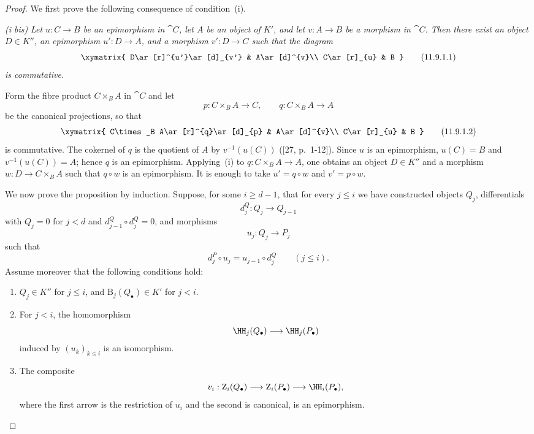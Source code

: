 \begin{proof}
We first prove the following consequence of condition~(i).

\medskip\noindent
\emph{(i bis)}
\emph{Let $u:C\to B$ be an epimorphism in $\cat{C}$, let $A$ be an
object of $K'$, and let $v:A\to B$ be a morphism in $\cat{C}$.
Then there exist an object $D\in K''$, an epimorphism $u':D\to A$, and a
morphism $v':D\to C$ such that the diagram}
\[
  \xymatrix{
    D\ar[r]^{u'}\ar[d]_{v'} & A\ar[d]^{v}\\
    C\ar[r]_{u} & B
  }
  \tag{11.9.1.1}\label{0.11.9.1.1}
\]
\emph{is commutative.}

Form the fibre product $C\times_B A$ in $\cat{C}$ and let
\[
  p:C\times_B A\longrightarrow C,
  \qquad
  q:C\times_B A\longrightarrow A
\]
be the canonical projections, so that
\[
  \xymatrix{
    C\times_B A\ar[r]^{q}\ar[d]_{p} & A\ar[d]^{v}\\
    C\ar[r]_{u} & B
  }
  \tag{11.9.1.2}\label{0.11.9.1.2}
\]
is commutative.
The cokernel of $q$ is the quotient of $A$ by $v^{-1}(u(C))$
([27, p.~1-12]).
Since $u$ is an epimorphism, $u(C)=B$ and
$v^{-1}(u(C))=A$; hence $q$ is an epimorphism.
Applying~(i) to $q:C\times_B A\to A$, one obtains an object
$D\in K''$ and a morphism $w:D\to C\times_B A$ such that $q\circ w$ is
an epimorphism.
It is enough to take $u'=q\circ w$ and $v'=p\circ w$.

\medskip
We now prove the proposition by induction.
Suppose, for some $i\geq d-1$, that for every $j\leq i$ we have
constructed objects $Q_j$, differentials
\[
  d^Q_j:Q_j\longrightarrow Q_{j-1}
\]
with $Q_j=0$ for $j<d$ and
$d^Q_{j-1}\circ d^Q_j=0$, and morphisms
\[
  u_j:Q_j\longrightarrow P_j
\]
such that
\[
  d^P_j\circ u_j=u_{j-1}\circ d^Q_j
  \qquad(j\leq i).
\]
Assume moreover that the following conditions hold:
\begin{enumerate}
  \item[$(\mathrm{I}_i)$]
  $Q_j\in K''$ for $j\leq i$, and
  $\mathrm{B}_j(Q_\bullet)\in K'$ for $j<i$.

  \item[$(\mathrm{II}_i)$]
  For $j<i$, the homomorphism
  \[
    \HH_j(Q_\bullet)\longrightarrow\HH_j(P_\bullet)
  \]
  induced by $(u_k)_{k\leq i}$ is an isomorphism.

  \item[$(\mathrm{III}_i)$]
  The composite
  \[
    v_i:
    \mathrm{Z}_i(Q_\bullet)
    \longrightarrow
    \mathrm{Z}_i(P_\bullet)
    \longrightarrow
    \HH_i(P_\bullet),
  \]
  where the first arrow is the restriction of $u_i$ and the second is
  canonical, is an epimorphism.
\end{enumerate}


\end{proof}
